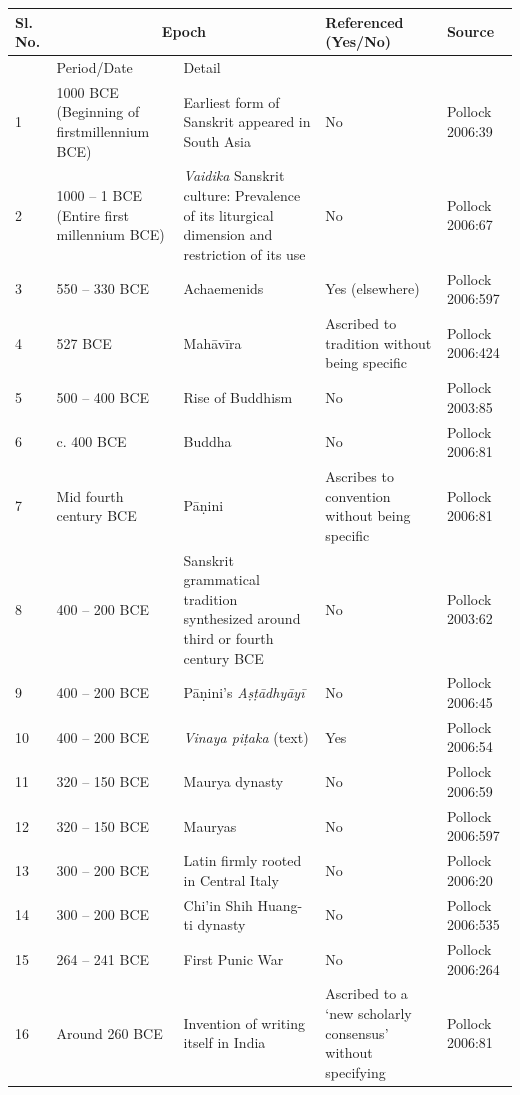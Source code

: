 \begin{longtable}{|l|p{1.9cm}|p{1.9cm}|p{1.6cm}|p{1.2cm}|}
\hline
Sl. No. & \multicolumn{2}{c|}{Epoch} & Referenced (Yes/No) & Source \\
\hline
 & Period/Date & Detail &  &  \\
\hline
1 & 1000 BCE (Beginning of first\break millennium BCE) & Earliest form of Sanskrit appeared in South Asia & No & Pollock 2006:39 \\
\hline
2 & 1000 – 1 BCE (Entire first millennium BCE) & \textit{Vaidika} Sanskrit culture: Prevalence of its liturgical dimension and restriction of its use & No & Pollock 2006:67 \\
\hline
3 & 550 – 330 BCE & Achaemenids\index{Achaemenids} & Yes (elsewhere) & Pollock 2006:597 \\
\hline
4 & 527 BCE & Mahāvīra\index{Mahavira@Mahāvīra} & Ascribed to tradi\break tion without being specific & Pollock 2006:424 \\
\hline
5 & 500 – 400 BCE & Rise of Buddhism\index{Buddhism} & No & Pollock\index{Pollock, Sheldon} 2003:85 \\
\hline
6 & c. 400 BCE & Buddha\index{Buddha, the} & No & Pollock 2006:81 \\
\hline
7 & Mid fourth century BCE & Pāṇini\index{Panini@Pāṇini} & Ascribes to conven\break tion without being specific & Pollock 2006:81 \\
\hline
8 & 400 – 200 BCE & Sanskrit grammatical tradition synthesized around third or fourth century BCE & No & Pollock 2003:62 \\
\hline
9 & 400 – 200 BCE & Pāṇini’s \textit{Aṣṭādhyāyī}\index{Astadhyayi@\textit{Aṣṭādhyāyī}} & No & Pollock 2006:45 \\
\hline
10 & 400 – 200 BCE & \textit{Vinaya piṭaka} (text) & Yes & Pollock 2006:54 \\
\hline
11 & 320 – 150 BCE & Maurya dynasty & No & Pollock 2006:59 \\
\hline
12 & 320 – 150 BCE & Mauryas & No & Pollock 2006:597 \\
\hline
13 & 300 – 200 BCE & Latin firmly rooted in Central Italy & No & Pollock 2006:20 \\
\hline
14 & 300 – 200 BCE & Chi’in Shih Huang-ti dynasty & No & Pollock 2006:535 \\
\hline
15 & 264 – 241 BCE & First Punic War & No & Pollock 2006:264 \\
\hline
16 & Around 260 BCE & Invention of writing itself in India & Ascribed to a ‘new scholarly consensus’ without specifying & Pollock 2006:81 \\

\end{longtable}
